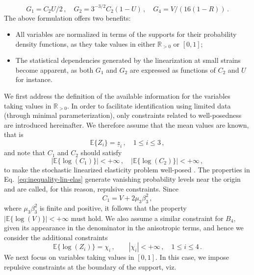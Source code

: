 \begin{equation}
    G_1 = C_2 U /2\,, \quad G_2 = 3^{-3/2} C_2 (1 - U)\,, \quad G_4 = V/\left(16(1-R)\right)\,.
\end{equation}
The above formulation offers two benefits:
\begin{itemize}
    \item All variables are normalized in terms of the supports for their probability density functions, as they take values in either $\mathbb{R}_{> 0}$ or $[0,1]$;
    \item The statistical dependencies generated by the linearization at small strains become apparent, as both $G_1$ and $G_2$ are expressed as functions of $C_2$ and $U$ for instance.
\end{itemize}
We first address the definition of the available information for the variables taking values in $\mathbb{R}_{> 0}$. In order to facilitate identification using limited data (through minimal parameterization), only constraints related to well-posedness are introduced hereinafter. We therefore assume that the mean values are known, that is
\begin{equation}\label{eq:mean-1-2-3}
    \mathbb{E}\{Z_i\} = \underline{z}_i\,, \quad 1 \leq i \leq 3\,,
\end{equation}  
and note that $ C_1$ and $C_2$ should satisfy  
\begin{equation}\label{eq:inequality-lin-elas}
    |\mathbb{E}\{ \log(C_1)\}| < +\infty\,, \quad |\mathbb{E}\{\log(C_2)\}| < +\infty\,,
\end{equation}
to make the stochastic linearized elasticity problem well-posed \cite{Soize2006,STABER2017399}. The properties in Eq.~\eqref{eq:inequality-lin-elas} generate vanishing probability levels near the origin and are called, for this reason, repulsive constraints. Since 
\begin{equation}
    C_1 = V + 2 \mu_3 \beta_3^2\,,
\end{equation}
where $\mu_3 \beta_3^2$ is finite and positive, it follows that the property $|\mathbb{E}\{\log(V)\}| < +\infty$ must hold. We also assume a similar constraint for $B_4$, given its appearance in the denominator in the anisotropic terms, and hence we consider the additional constraints
\begin{equation}\label{eq:rep-1-2-3}
    \mathbb{E}\{\log{(Z_i)}\} = \chi_i\,, \quad \quad |\chi_i| < + \infty \,, \quad 1 \leq i \leq 4\,.
\end{equation}
We next focus on variables taking values in $[0, 1]$. In this case, we impose repulsive constraints at the boundary of the support, viz.
